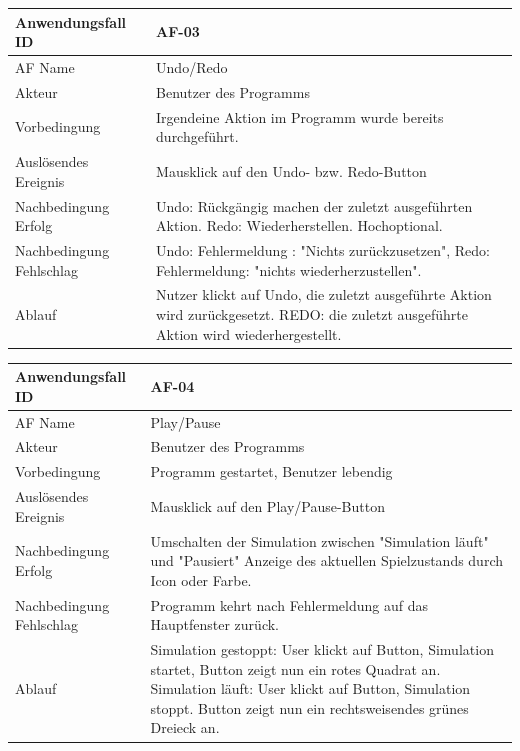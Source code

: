 \documentclass[11pt,a4paper]{article}
\begin{document}
\begin{tabular}[m]{|m{7cm}|m{9cm}|}
    \hline
    Anwendungsfall ID     & AF-03  \\
         \hline
    AF Name     &  Undo/Redo \\
         \hline
    Akteur&Benutzer des Programms \\
    \hline
    Vorbedingung&Irgendeine Aktion im Programm wurde bereits durchgeführt.\\
    \hline
    Auslösendes Ereignis&Mausklick auf den Undo- bzw. Redo-Button\\
    \hline
    Nachbedingung Erfolg&Undo: Rückgängig machen der zuletzt ausgeführten Aktion. Redo: Wiederherstellen. Hochoptional.\\
    \hline
    Nachbedingung Fehlschlag&Undo: Fehlermeldung : "Nichts zurückzusetzen", Redo: Fehlermeldung: "nichts wiederherzustellen".\\
    \hline
    Ablauf&Nutzer klickt auf Undo, die zuletzt ausgeführte Aktion wird zurückgesetzt. REDO: die zuletzt ausgeführte Aktion wird wiederhergestellt.\\
    \hline
\end{tabular}
\par


\begin{tabular}[m]{|m{7cm}|m{9cm}|}
    \hline
    Anwendungsfall ID     & AF-04 \\
         \hline
    AF Name     &  Play/Pause \\
         \hline
    Akteur&Benutzer des Programms \\
    \hline
    Vorbedingung&Programm gestartet, Benutzer lebendig\\
    \hline
    Auslösendes Ereignis&Mausklick auf den Play/Pause-Button\\
    \hline
    Nachbedingung Erfolg&Umschalten der Simulation zwischen "Simulation läuft" und "Pausiert" Anzeige des aktuellen Spielzustands durch Icon oder Farbe.\\
    \hline
    Nachbedingung Fehlschlag&Programm kehrt nach Fehlermeldung auf das Hauptfenster zurück.\\
    \hline
    Ablauf&Simulation gestoppt: User klickt auf Button, Simulation startet, Button zeigt nun ein rotes Quadrat an. Simulation läuft: User klickt auf Button, Simulation stoppt. Button zeigt nun ein rechtsweisendes grünes Dreieck an.\\
    \hline
\end{tabular}
\par
\end{document}
